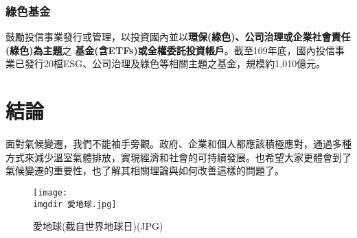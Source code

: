 \documentclass[12pt, a4paper]{article}
\begin{document}
\subsubsection{綠色基金}
鼓勵投信事業發行或管理，以投資國內並以\textbf{環保(綠色)、公司治理或企業社會責任(綠色)為主題}之\textbf{ \textcolor{gold(metallic)}{ 基金(含ETFs)或全權委託投資帳戶}}。截至109年底，國內投信事業已發行20檔ESG、公司治理及綠色等相關主題之基金，規模約1,010億元。



\section{結論}
面對氣候變遷，我們不能袖手旁觀。政府、企業和個人都應該積極應對，通過多種方式來減少溫室氣體排放，實現經濟和社會的可持續發展。也希望大家更體會到了氣候變遷的重要性，也了解其相關理論與如何改善這樣的問題了。

\begin{figure}[hb]
\centering
  \texttt{[image: \\imgdir 愛地球.jpg]}
  \caption{愛地球(截自世界地球日)(JPG)}
\end{figure}
\end{document}

